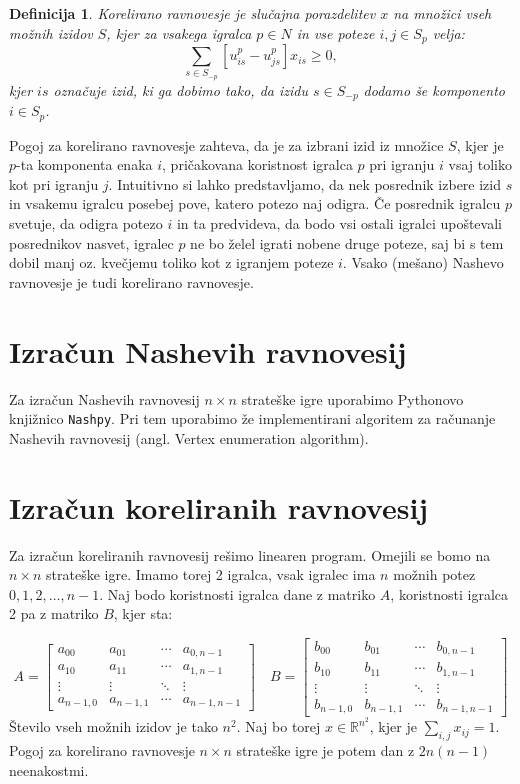 \documentclass{article}
\newtheorem{definition}{Definicija}
\begin{document}
\begin{definition}
    \emph{Korelirano ravnovesje} je slučajna porazdelitev $x$ na množici vseh možnih izidov $S$, kjer za vsakega igralca $p\in N$ in vse poteze $i,j\in S_p$ velja:
    $$ \sum_{s\in S_{-p}} [u_{is}^p - u_{js}^p] x_{is} \geq 0, $$
kjer $is$ označuje izid, ki ga dobimo tako, da izidu $s \in S_{-p}$ dodamo še komponento $i\in S_p$.
\end{definition}
Pogoj za korelirano ravnovesje zahteva, da je za izbrani izid iz množice $S$, kjer je $p$-ta komponenta enaka $i$, pričakovana koristnost igralca $p$ pri igranju $i$ vsaj toliko kot pri igranju $j$. Intuitivno si lahko predstavljamo, da nek posrednik izbere izid $s$ in vsakemu igralcu posebej pove, katero potezo naj odigra. Če posrednik igralcu $p$ svetuje, da odigra potezo $i$ in ta predvideva, da bodo vsi ostali igralci upoštevali posrednikov nasvet, igralec $p$ ne bo želel igrati nobene druge poteze, saj bi s tem dobil manj oz. kvečjemu toliko kot z igranjem poteze $i$. Vsako (mešano) Nashevo ravnovesje je tudi korelirano ravnovesje.

\section{Izračun Nashevih ravnovesij}
Za izračun Nashevih ravnovesij $n \times n$ strateške igre uporabimo Pythonovo knjižnico \texttt{Nashpy}. Pri tem uporabimo že implementirani algoritem za računanje Nashevih ravnovesij (angl. Vertex enumeration algorithm).

\section{Izračun koreliranih ravnovesij}
Za izračun koreliranih ravnovesij rešimo linearen program. Omejili se bomo na $n\times n$ strateške igre. Imamo torej 2 igralca, vsak igralec ima $n$ možnih potez $0,1,2,\dots, n-1$. Naj bodo koristnosti igralca dane z matriko $A$, koristnosti igralca 2 pa z matriko $B$, kjer sta:

\[
A = \begin{bmatrix}
    a_{00} & a_{01} & \cdots & a_{0,n-1} \\
    a_{10} & a_{11} & \cdots & a_{1,n-1} \\
    \vdots & \vdots & \ddots & \vdots \\
    a_{n-1,0} & a_{n-1,1} & \cdots & a_{n-1,n-1}
\end{bmatrix}
\quad
B = \begin{bmatrix}
    b_{00} & b_{01} & \cdots & b_{0,n-1} \\
    b_{10} & b_{11} & \cdots & b_{1,n-1} \\
    \vdots & \vdots & \ddots & \vdots \\
    b_{n-1,0} & b_{n-1,1} & \cdots & b_{n-1,n-1}
\end{bmatrix}
\]
Število vseh možnih izidov je tako $n^2$. Naj bo torej $x \in \mathbb{R}^{n^2}$, kjer je $\sum_{i,j} x_{ij} = 1$. Pogoj za korelirano ravnovesje $n\times n$ strateške igre je potem dan z $2n(n-1)$ neenakostmi.
\end{document}
